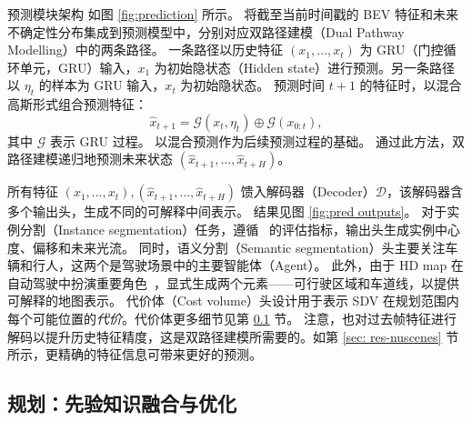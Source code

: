 \documentclass[runningheads]{llncs}
\begin{document}
%
%
预测模块架构
如图 \ref{fig:prediction} 所示。
%
将截至当前时间戳的 BEV 特征和未来不确定性分布集成到预测模型中，分别对应双路径建模（Dual Pathway Modelling）中的两条路径。
%
%
一条路径以历史特征 $(x_1, \dots, x_t)$ 为 GRU（门控循环单元，GRU）输入，$x_1$ 为初始隐状态（Hidden state）进行预测。另一条路径以 $\eta_t$ 的样本为 GRU 输入，$x_t$ 为初始隐状态。
%
预测时间 $t+1$ 的特征时，以混合高斯形式组合预测特征：
\begin{equation}
    \hat{x}_{t+1} = \mathcal{G}(x_t, \eta_t) \oplus \mathcal{G}(x_{0:t}),
\end{equation}
%
其中 $\mathcal{G}$ 表示 GRU 过程。
%
以混合预测作为后续预测过程的基础。
%
通过此方法，双路径建模递归地预测未来状态 $(\hat{x}_{t+1},\dots, \hat{x}_{t+H})$。



所有特征 $(x_1, \dots, x_t), (\hat{x}_{t+1},\dots, \hat{x}_{t+H})$ 馈入解码器（Decoder）$\mathcal{D}$，该解码器含多个输出头，生成不同的可解释中间表示。
%
结果见图 \ref{fig:pred outputs}。
%
对于实例分割（Instance segmentation）任务，遵循~\cite{hu2021fiery} 的评估指标，输出头生成实例中心度、偏移和未来光流。
%
同时，语义分割（Semantic segmentation）头主要关注车辆和行人，这两个是驾驶场景中的主要智能体（Agent）。
%
此外，由于 HD map 在自动驾驶中扮演重要角色~\cite{sadat2020perceive,sadat2019jointly,zeng2019end}，显式生成两个元素——可行驶区域和车道线，以提供可解释的地图表示。
%
代价体（Cost volume）头设计用于表示 SDV 在规划范围内每个可能位置的\textit{代价}。代价体更多细节见第 \ref{sec: method-plan} 节。
%
注意，也对过去帧特征进行解码以提升历史特征精度，这是双路径建模所需要的。如第 \ref{sec: res-nuscenes} 节所示，更精确的特征信息可带来更好的预测。






\subsection{规划：先验知识融合与优化}
\label{sec: method-plan}

\end{document}
